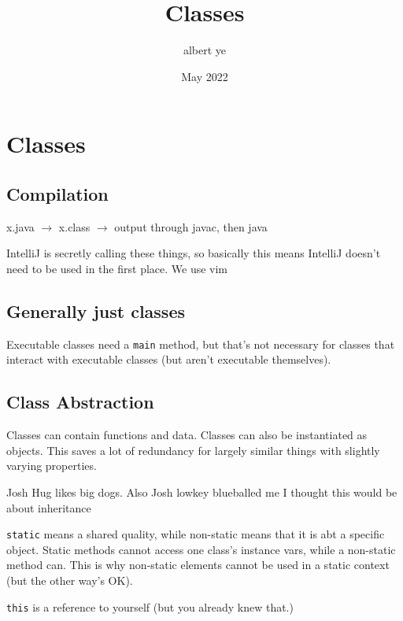 \documentclass{scrartcl}
\title{Classes}
\author{albert ye}
\date{May 2022}
\begin{document}
\maketitle

\section{Classes}
\subsection{Compilation}
x.java $\rightarrow$ x.class $\rightarrow$ output through javac, then java

IntelliJ is secretly calling these things, so basically this means IntelliJ
doesn't need to be used in the first place. We use vim

\subsection{Generally just classes}

Executable classes need a \texttt{main} method, but that's not necessary for
classes that interact with executable classes (but aren't executable
themselves).

\subsection{Class Abstraction}
Classes can contain functions and data. Classes can also be instantiated
as objects. This saves a lot of redundancy for largely similar things with
slightly varying properties.

Josh Hug likes big dogs. Also Josh lowkey blueballed me I thought this would
be about inheritance

\texttt{static} means a shared quality, while non-static means that it is abt
a specific object. Static methods cannot access one class's instance vars,
while a non-static method can. This is why non-static elements cannot 
be used in a static context (but the other way's OK).

\texttt{this} is a reference to yourself (but you already knew that.)
\end{document}

